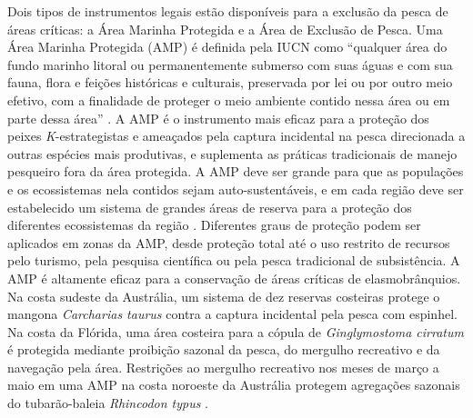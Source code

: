 \documentclass[a4paper,11pt,twoside,showtrims,onecolumn,openright,final]{memoir}
\begin{document}
Dois tipos de instrumentos legais estão disponíveis para a exclusão da pesca de áreas críticas: 
a Área Marinha Protegida e a Área de Exclusão de Pesca. Uma Área Marinha Protegida (AMP) é 
definida pela IUCN como ``qualquer área do fundo marinho litoral ou permanentemente submerso com 
suas águas e com sua fauna, flora e feições históricas e culturais, preservada por lei ou por outro 
meio efetivo, com a finalidade de proteger o meio ambiente contido nessa área 
ou em  parte dessa área'' \citep[tradução dos autores]{walker2004}. %
A AMP é o instrumento mais eficaz para a proteção dos peixes \emph{K}-estrategistas e ameaçados 
pela captura incidental na pesca direcionada a outras espécies mais produtivas, e suplementa 
as práticas tradicionais de manejo pesqueiro fora da área protegida. A AMP deve ser grande para 
que as populações e os ecossistemas nela contidos sejam  auto-sustentáveis, e em cada região deve 
ser estabelecido um sistema de grandes áreas de reserva para a proteção dos diferentes ecossistemas 
da região \citep{musick2000a}. %
Diferentes graus de proteção podem ser aplicados em zonas da AMP, desde proteção total até o uso 
restrito de recursos pelo turismo, pela pesquisa científica ou pela pesca tradicional de subsistência. 
A AMP é altamente eficaz para a conservação de áreas críticas de elasmobrânquios. 
Na costa sudeste da Austrália, um sistema de dez 
reservas costeiras  protege o mangona \emph{Carcharias taurus} 
contra a captura incidental pela pesca com espinhel. 
Na costa da Flórida, uma  área costeira para a cópula de \emph{Ginglymostoma cirratum} é protegida 
mediante proibição sazonal da pesca, do mergulho recreativo e  da navegação pela área. 
Restrições ao mergulho recreativo nos meses de março a maio em uma AMP na costa noroeste  
da Austrália protegem agregações sazonais do tubarão-baleia \emph{Rhincodon typus} \citep{walker2004}. %
\end{document}
